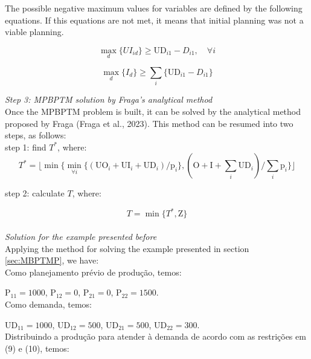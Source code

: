 \documentclass[authoryear,preprint,12pt]{elsarticle}
\begin{document}
The possible negative maximum values for variables are defined by the following equations. If this equations are not met, it means that initial planning was not a viable planning.

\begin{equation}
\max_d\{UI_{id}\} \geq \textrm{UD}_{i1} - D_{i1}, \quad \forall i
\end{equation}

\begin{equation}
\max_d\{I_{d}\} \geq \sum_{i}\{ \textrm{UD}_{i1} - D_{i1} \}
\end{equation}

\emph{Step 3: MPBPTM solution by Fraga's analytical method} \\

Once the MPBPTM problem is built, it can be solved by the analytical method proposed by Fraga (Fraga et al., 2023). This method can be resumed into two steps, as follows: \\

step 1: find $T^*$, where:
\begin{equation}
T^* = \lfloor{\min \{\min_{\forall i} \{(\textrm{UO}_i + \textrm{UI}_i + \textrm{UD}_i) / \textrm{p}_i\},(\textrm{O} + \textrm{I} + \sum_i \textrm{UD}_i) / \sum_i {\textrm{p}_i}\}}\rfloor
\end{equation}

step 2: calculate $T$, where: 

\begin{equation}
T = \min \{T^* , \textrm{Z}\}
\end{equation} \\

\emph{Solution for the example presented before} \\

Applying the method for solving the example presented in section \ref{sec:MBPTMP}, we have: \\

Como planejamento prévio de produção, temos:

$\textrm{P}_{11} = 1000$,
$\textrm{P}_{12} = 0$,
$\textrm{P}_{21} = 0$,
$\textrm{P}_{22} = 1500$. \\

Como demanda, temos:

$\textrm{UD}_{11} = 1000$,
$\textrm{UD}_{12} = 500$,
$\textrm{UD}_{21} = 500$,
$\textrm{UD}_{22} = 300$. \\

Distribuindo a produção para atender à demanda de acordo com as restrições em (9) e (10), temos: \\
\end{document}
